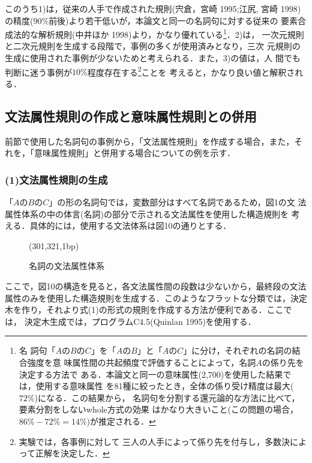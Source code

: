 このうち1)は，従来の人手で作成された規則(宍倉，宮崎 1995;江尻, 宮崎
1998)の精度($90\%$前後)より若干低いが，本論文と同一の名詞句に対する従来の
要素合成法的な解析規則(中井ほか 1998)より，かなり優れている\footnote{名
詞句「$AのBのC$」を「$AのB$」と「$AのC$」に分け，それぞれの名詞の結合強度を意
味属性間の共起頻度で評価することによって，名詞$A$の係り先を決定する方法で
ある．本論文と同一の意味属性(2,700)を使用した結果では，使用する意味属性
を81種に絞ったとき，全体の係り受け精度は最大($72\%$)になる．この結果から，
名詞句を分割する還元論的な方法に比べて，要素分割をしないwhole方式の効果
はかなり大きいこと(この問題の場合，$86\%-72\%=14\%$)が推定される．}．2)は，
一次元規則と二次元規則を生成する段階で，事例の多くが使用済みとなり，三次
元規則の生成に使用された事例が少ないためと考えられる．また，3)の値は，人
間でも判断に迷う事例が$10\%$程度存在する\footnote{実験では，各事例に対して
三人の人手によって係り先を付与し，多数決によって正解を決定した．}ことを
考えると，かなり良い値と解釈される．
\subsection{文法属性規則の作成と意味属性規則との併用}
前節で使用した名詞句の事例から，「文法属性規則」を作成する場合，また，そ
れを，「意味属性規則」と併用する場合についての例を示す．
\subsubsection*{(1)文法属性規則の生成}
「$AのBのC$」の形の名詞句では，変数部分はすべて名詞であるため，図1の文
法属性体系の中の体言(名詞)の部分で示される文法属性を使用した構造規則を
考える．具体的には，使用する文法体系は図10の通りとする．

\begin{figure}[thb]
\begin{center}
\begin{epsf}
\end{epsf}
\begin{draft}
\atari(301,321,1bp)
\end{draft}
\end{center}
\vspace*{-4mm}
\caption{名詞の文法属性体系}
\label{fig:名詞の文法属性体系}
\end{figure}


ここで，図10の構造を見ると，各文法属性間の段数は少ないから，最終段の文法
属性のみを使用した構造規則を生成する．このようなフラットな分類では，決定
木を作り，それより式(1)の形式の規則を作成する方法が便利である．ここでは，
決定木生成では，プログラムC4.5(Quinlan 1995)を使用する．

